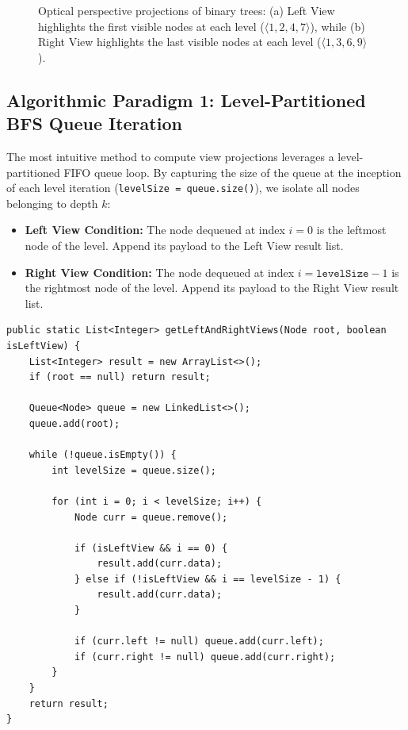 \documentclass[10pt,journal,compsoc,onecolumn]{IEEEtran}
\begin{document}
\begin{figure}[htbp]
\caption{Optical perspective projections of binary trees: (a) Left View highlights the first visible nodes at each level ($\langle 1, 2, 4, 7 \rangle$), while (b) Right View highlights the last visible nodes at each level ($\langle 1, 3, 6, 9 \rangle$).}
\label{fig:views_projection_master}
\end{figure}

\subsection{Algorithmic Paradigm 1: Level-Partitioned BFS Queue Iteration}

The most intuitive method to compute view projections leverages a level-partitioned FIFO queue loop. By capturing the size of the queue at the inception of each level iteration (\texttt{levelSize = queue.size()}), we isolate all nodes belonging to depth $k$:
\begin{itemize}
    \item \textbf{Left View Condition:} The node dequeued at index $i = 0$ is the leftmost node of the level. Append its payload to the Left View result list.
    \item \textbf{Right View Condition:} The node dequeued at index $i = \texttt{levelSize} - 1$ is the rightmost node of the level. Append its payload to the Right View result list.
\end{itemize}

\begin{verbatim}
public static List<Integer> getLeftAndRightViews(Node root, boolean isLeftView) {
    List<Integer> result = new ArrayList<>();
    if (root == null) return result;

    Queue<Node> queue = new LinkedList<>();
    queue.add(root);

    while (!queue.isEmpty()) {
        int levelSize = queue.size();

        for (int i = 0; i < levelSize; i++) {
            Node curr = queue.remove();

            if (isLeftView && i == 0) {
                result.add(curr.data);
            } else if (!isLeftView && i == levelSize - 1) {
                result.add(curr.data);
            }

            if (curr.left != null) queue.add(curr.left);
            if (curr.right != null) queue.add(curr.right);
        }
    }
    return result;
}
\end{verbatim}
\end{document}
